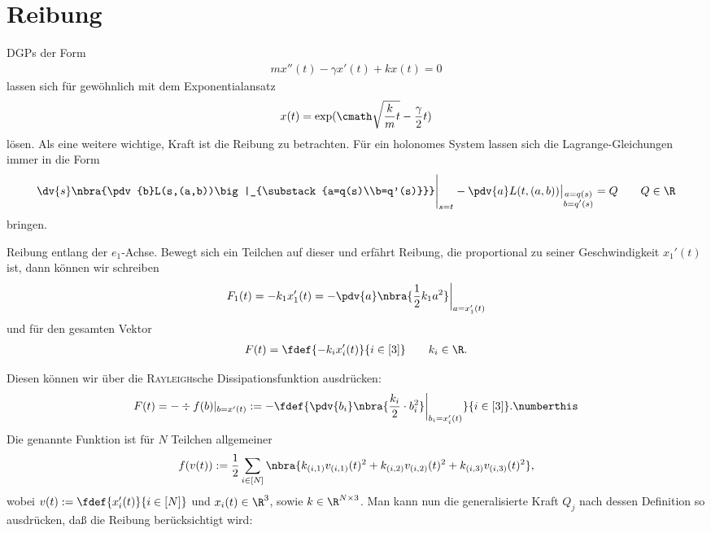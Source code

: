 \documentclass[../WiSe22ANA3.tex]{subfiles}
\begin{document}
  	\section{Reibung}
		DGPs der Form
		\begin{align*}
			mx''(t)-\gamma x'(t)+kx(t)=0
		\end{align*}
		lassen sich für gewöhnlich mit dem Exponentialansatz 
		\begin{align*}
			x(t)=\exp(\cmath\sqrt{\frac{k}{m}t}-\frac{\gamma}{2}t) 
		\end{align*}
		lösen. Als eine weitere wichtige,  Kraft ist die Reibung zu betrachten. Für ein holonomes System lassen sich die Lagrange-Gleichungen immer in die Form
		\begin{align*}
			\dv{s}\nbra{\pdv{b}L(s,(a,b))\big|_{\substack{a=q(s)\\b=q'(s)}}}\Bigg|_{s=t}-\pdv{a}L(t,(a,b))\big|_{\substack{a=q(s)\\b=q'(s)}}=Q\qquad Q\in\R
		\end{align*}
		bringen. 
		\begin{bsp}
			Reibung entlang der $e_1$-Achse. Bewegt sich ein Teilchen auf dieser und erfährt Reibung, die proportional zu seiner Geschwindigkeit $x_1'(t)$ ist, dann können wir schreiben
			\begin{align*}
				F_1(t)=-k_1 x_1'(t)=-\pdv{a}\nbra{\frac{1}{2}k_1 a^2}\bigg|_{a=x_1'(t)}
			\end{align*}	
			und für den gesamten Vektor
			\begin{align*}
				F(t)=\fdef{-k_i x_i'(t)}{i\in[3]} \qquad k_i\in\R.
			\end{align*}
		\end{bsp}
		Diesen können wir über die \textsc{Rayleigh}sche Dissipationsfunktion ausdrücken:
		\begin{align*}
			F(t)=-\div f(b)|_{b=x'(t)}:=-\fdef{\pdv{b_i}\nbra{\frac{k_i}{2}\cdot b_i^2}\bigg|_{b_i=x_i'(t)}}{i\in[3]}.\numberthis\label{eq:ReibungRayleigh} 
		\end{align*}
		Die genannte Funktion ist für $N$ Teilchen allgemeiner
		\begin{align*}
			f(v(t)):=\frac{1}{2}\sum_{i\in[N]}\nbra{k_{(i,1)}v_{(i,1)}(t)^2+k_{(i,2)}v_{(i,2)}(t)^2+k_{(i,3)}v_{(i,3)}(t)^2},
		\end{align*}
		wobei $v(t):=\fdef{x_i'(t)}{i\in[N]}$ und $x_i(t)\in\R^3$, sowie $k\in\R^{N\times 3}$. Man kann nun die generalisierte Kraft $Q_j$ nach dessen Definition so ausdrücken, daß die Reibung berücksichtigt wird:
\end{document}

